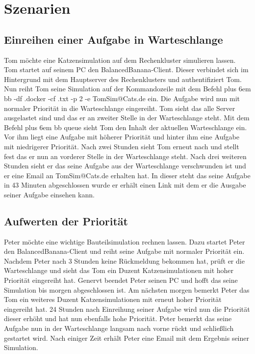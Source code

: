 \documentclass[a4paper,12pt]{article}
\makeatletter
\newenvironment{mycode}
 {\def\@xobeysp{\ }\verbatim\rightskip=0pt plus 6em\relax}
 {\endverbatim}
\makeatother
\begin{document}


\clearpage
\section{Szenarien}

\subsection{\textbf{Einreihen einer Aufgabe in Warteschlange}}
Tom möchte eine Katzensimulation auf dem Rechenkluster simulieren lassen. %
Tom startet auf seinem PC den BalancedBanana-Client. Dieser verbindet sich im Hintergrund mit dem Hauptserver des Rechenklusters und authentifiziert Tom.
Nun reiht Tom seine Simulation auf der Kommandozeile mit dem Befehl 
\begin{mycode}
	bb -df \CatSimulation.docker -cf \Config.txt -p 2 -e TomSim@Cats.de
\end{mycode}
ein. %
Die Aufgabe wird nun mit normaler Priorität in die Warteschlange eingereiht.
Tom sieht das alle Server ausgelastet sind und das er an zweiter Stelle in der Warteschlange steht.
Mit dem Befehl
\begin{mycode}
	bb queue
\end{mycode}
sieht Tom den Inhalt der aktuellen Warteschlange ein. Vor ihm liegt eine Aufgabe mit höherer Priorität und hinter ihm eine Aufgabe mit niedrigerer Priorität.
Nach zwei Stunden sieht Tom erneut nach und stellt fest das er nun an vorderer Stelle in der Warteschlange steht.
Nach drei weiteren Stunden sieht er das seine Aufgabe aus der Warteschlange verschwunden ist und er eine Email an TomSim@Cats.de erhalten hat.
In dieser steht das seine Aufgabe in 43 Minuten abgeschlossen wurde er erhält einen Link mit dem er die Ausgabe seiner Aufgabe einsehen kann.

\subsection{\textbf{Aufwerten der Priorität}}
Peter möchte eine wichtige Bauteilsimulation rechnen lassen.
Dazu startet Peter den BalancedBanana-Client und reiht seine Aufgabe mit normaler Priorität ein.
Nachdem Peter nach 3 Stunden keine Rückmeldung bekommen hat, prüft er die Warteschlange und sieht das Tom ein Duzent Katzensimulationen mit hoher Priorität eingereiht hat.
Genervt beendet Peter seinen PC und hofft das seine Simulation bis morgen abgeschlossen ist.
Am nächsten morgen bemerkt Peter das Tom ein weiteres Duzent Katzensimulationen mit erneut hoher Priorität eingereiht hat.
24 Stunden nach Einreihung seiner Aufgabe wird nun die Priorität dieser erhöht und hat nun ebenfalls hohe Priorität.
Peter bemerkt das seine Aufgabe nun in der Warteschlange langsam nach vorne rückt und schließlich gestartet wird. 
Nach einiger Zeit erhält Peter eine Email mit dem Ergebnis seiner Simulation.
\end{document}
